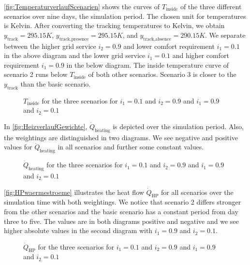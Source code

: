 \autoref{fig:TemperaturverlaufScenarien} shows the curves of $T_\text{inside}$ of the three different scenarios over nine days, the simulation period. The chosen unit for temperatures is Kelvin. After converting  the tracking temperatures to Kelvin, we obtain $y_\text{track} = 295.15 K$, $y_\text{track,presence} = 295.15 K$, and $y_\text{track,absence} = 290.15 K$. We separate between the higher grid service $i_\text{2} = 0.9$ and lower comfort requirement $i_\text{1} = 0.1$ in the above diagram and the lower grid service $i_\text{1} = 0.1$ and higher comfort requirement $i_\text{1} = 0.9$ in the below diagram.\newline 
The inside temperature curve of scenario 2 runs below $T_\text{inside}$ of both other scenarios. Scenario 3 is closer to the $y_\text{track}$ than the basic scenario. 
    \begin{figure}[H]
           \centering
        \def\svgwidth{1\textwidth}
        
        \caption{$T_\text{inside}$ for the three scenarios for $i_\text{1} = 0.1$ and $i_\text{2} = 0.9$ and $i_\text{1} = 0.9$ and $i_\text{2} = 0.1$}
         \label{fig:TemperaturverlaufScenarien}
    \end{figure}
 
In \autoref{fig:HeizverlaufGewichte}, $\dot{Q}_\text{heating}$ is depicted over the simulation period. Also, the weightings are distinguished in two diagrams. We see negative and positive values for $\dot{Q}_\text{heating}$ in all scenarios and further some constant values.
     \begin{figure}[H]
           \centering
        \def\svgwidth{1.05\textwidth}
        
        \caption{$\dot{Q}_\text{heating}$ for the three scenarios for $i_\text{1} = 0.1$ and $i_\text{2} = 0.9$ and $i_\text{1} = 0.9$ and $i_\text{2} = 0.1$}
         \label{fig:HeizverlaufGewichte}
    \end{figure}
    
\autoref{fig:HPwaermestroeme} illustrates the heat flow $\dot{Q}_\text{HP}$ for all scenarios over the simulation time with both weightings. We notice that scenario 2 differs stronger from the other scenarios and the basic scenario has a constant period from day three to five. The values are in both diagrams positive and negative and we see higher absolute values in the second diagram with $i_\text{1} = 0.9$ and $i_\text{2} = 0.1$.

    \begin{figure}[H]
           \centering
        \def\svgwidth{1.01\textwidth}
        
        \caption{$\dot{Q}_\text{HP}$ for the three scenarios for $i_\text{1} = 0.1$ and $i_\text{2} = 0.9$ and $i_\text{1} = 0.9$ and $i_\text{2} = 0.1$}
         \label{fig:HPwaermestroeme}
    \end{figure}
    
